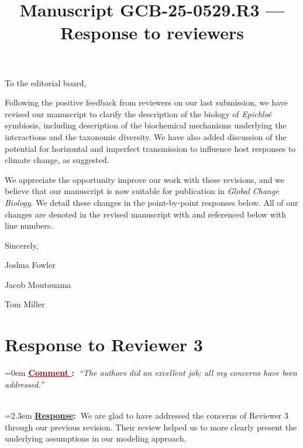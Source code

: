 \documentclass[12pt]{article}
\newcounter{cN}
\newcommand{\comment}[1]{
	\vspace{2em}
	\refstepcounter{cN} %
	\noindent \hangindent=0em \textbf{\textcolor{Maroon}{\uline{Comment \thecN}:~}}\emph{``#1''}
	}
\newcommand{\response}[1]{
	\\[0.25em]
	\hangindent=2.3em \textbf{\textcolor{NavyBlue}{\uline{Response}:~}}#1
	}
\newcommand{\revise}[1]{{\color{Mahogany}{#1}}}
\newcommand{\linesref}[2]{
		\\[0.25em]
	\hangindent=2.3em {\color{Mahogany} Line(s): \ref{#1} - \ref{#2}}
}
\begin{document}
\title{Manuscript GCB-25-0529.R3 --- Response to reviewers}

\maketitle
\noindent To the editorial board,


Following the positive feedback from reviewers on our last submission, we have revised our manuscript to clarify the description of the biology of \emph{Epichloë} symbiosis, including description of the biochemical mechanisms underlying the interactions and the taxonomic diversity. 
We have also added discussion of the potential for horizontal and imperfect transmission to influence host responses to climate change, as suggested.

We appreciate the opportunity improve our work with these revisions, and we believe that our manuscript is now suitable for publication in \emph{Global Change Biology}.
We detail these changes in the point-by-point responses below.
All of our changes are denoted in the revised manuscript with \revise{Mahogany font} and referenced below with line numbers. 




\vspace{2em}
Sincerely,

Joshua Fowler

Jacob Moutouama

Tom Miller



\newpage

\section{Response to Reviewer 3}
\vspace{-2em}





\comment{The authors did an excellent job; all my concerns have been addressed.}
\response{We are glad to have addressed the concerns of Reviewer 3 through our previous revision. Their review helped us to more clearly present the underlying assumptions in our modeling approach.}
\end{document}
